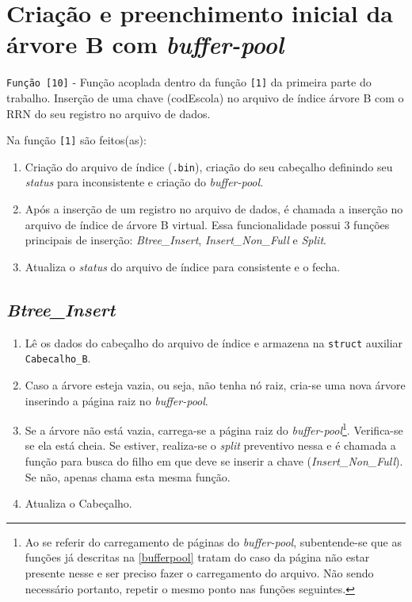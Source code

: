 \documentclass[
	12pt,				%
	openany,			%
	twoside,			%
	a4paper,			%
	english,			%
	french,				%
	spanish,			%
	brazil,				%
	]{abntex2}
\begin{document}
\section{Criação e preenchimento inicial da árvore B com \textit{buffer-pool}}\label{criab}

    \verb|Função [10]| - Função acoplada dentro da função \verb|[1]| da primeira parte do trabalho. Inserção de uma chave (codEscola) no arquivo de índice árvore B com o RRN do seu registro no arquivo de dados.
    
    Na função \verb|[1]| são feitos(as):
    \begin{enumerate}
        \item Criação do arquivo de índice (\verb|.bin|), criação do seu cabeçalho definindo seu \textit{status} para inconsistente e criação do \textit{buffer-pool}.
        \item Após a inserção de um registro no arquivo de dados, é chamada a inserção no arquivo de índice de árvore B virtual. Essa funcionalidade possui 3 funções principais de inserção: \textit{Btree\_Insert}, \textit{Insert\_Non\_Full} e \textit{Split}.
        \item Atualiza o \textit{status} do arquivo de índice para consistente e o fecha.
    \end{enumerate}
    
    \subsection{\textit{Btree\_Insert}}
    
        \begin{enumerate}
            \item Lê os dados do cabeçalho do arquivo de índice e armazena na \verb|struct| auxiliar \verb|Cabecalho_B|.
            \item Caso a árvore esteja vazia, ou seja, não tenha nó raiz, cria-se uma nova árvore inserindo a página raiz no \textit{buffer-pool}.
            \item Se a árvore não está vazia, carrega-se a página raiz do \textit{buffer-pool}\footnote{Ao se referir do carregamento de páginas do \textit{buffer-pool}, subentende-se que as funções já descritas na \autoref{bufferpool} tratam do caso da página não estar presente nesse e ser preciso fazer o carregamento do arquivo. Não sendo necessário portanto, repetir o mesmo ponto nas funções seguintes.}. Verifica-se se ela está cheia. Se estiver, realiza-se o \textit{split} preventivo nessa e é chamada a função para busca do filho em que deve se inserir a chave (\textit{Insert\_Non\_Full}). Se não, apenas chama esta mesma função.
            \item Atualiza o Cabeçalho.
        \end{enumerate}
\end{document}
